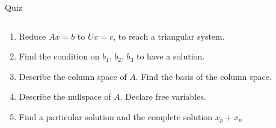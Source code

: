 \documentclass[aspectratio=169]{beamer}
\begin{document}
\begin{frame}[t]{Quiz}
\begin{columns}[T,onlytextwidth]
    \begin{column}{0.7\textwidth}
        \begin{enumerate}
            \item Reduce $Ax=b$ to $Ux=c$, to reach a triangular system.
            \item Find the condition on $b_1$, $b_2$, $b_3$ to have a solution.
            \item Describe the column space of $A$. Find the basis of the column space.
            \item Describe the nullspace of $A$. Declare free variables.
            \item Find a particular solution and the complete solution $x_p + x_n$
        \end{enumerate}
    \end{column}
\end{columns}
\end{frame}
\end{document}
